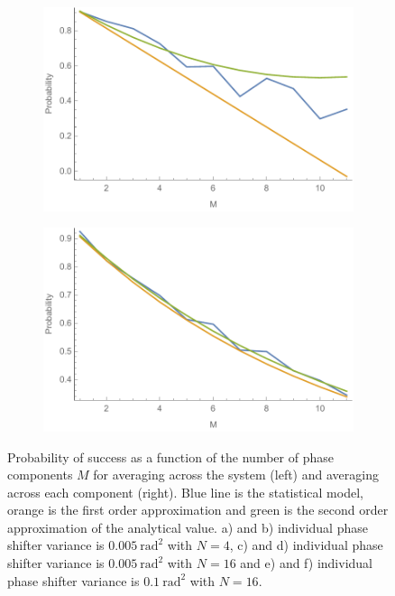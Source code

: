 \documentclass[aps,pra,twocolumn,superscriptaddress,numerical,floatfix]{revtex4-1}
\begin{document}
\begin{figure}
	\begin{subfigure}[b]{.45\columnwidth}
		\includegraphics[width=\columnwidth]{Psuccess_e.pdf}
		\caption{}\label{fig:phase psuccess e}
	\end{subfigure}
	\begin{subfigure}[b]{.45\columnwidth}
		\includegraphics[width=\columnwidth]{Psuccess_f.pdf}
		\caption{}\label{fig:phase psuccess f}
	\end{subfigure}
	
	\caption[Prob success for phase systems]{Probability of success as a function of the number of phase components $M$ for averaging across the system (left) and averaging across each component (right). Blue line is the statistical model, orange is the first order approximation and green is the second order approximation of the analytical value. a) and b) individual phase shifter variance is $0.005\ \textrm{rad}^{2}$ with $N=4$, c) and d) individual phase shifter variance is $0.005\ \textrm{rad}^{2}$ with $N=16$ and e) and f) individual phase shifter variance is $0.1\ \textrm{rad}^{2}$ with $N=16$. \label{fig:Probability-of-success all}}
\end{figure}
\end{document}
